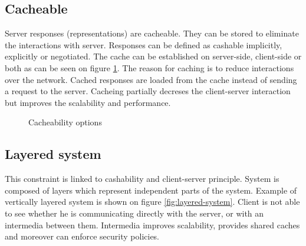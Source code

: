 \subsection{Cacheable}

Server responses (representations) are cacheable. They can be stored to eliminate the interactions with server. Responses can be defined as cashable implicitly, explicitly or negotiated. The cache can be established on server-side, client-side or both as can be seen on figure \ref{fig:cacheability}. The reason for caching is to reduce interactions over the network. Cached responses are loaded from the cache instead of sending a request to the server. 
Cacheing partially decreses the client-server interaction but improves the scalability and performance. 


\begin{figure}[htp] 
\caption{Cacheability options}
\label{fig:cacheability}
\end{figure} 

\subsection{Layered system}

This constraint is linked to cashability and client-server principle. System is composed of layers which represent independent parts of the system. Example of vertically layered system is shown on figure \ref{fig:layered-system}. Client is not able to see whether he is communicating directly with the server, or with an intermedia between them. Intermedia improves scalability, provides shared caches and moreover can enforce security policies.

